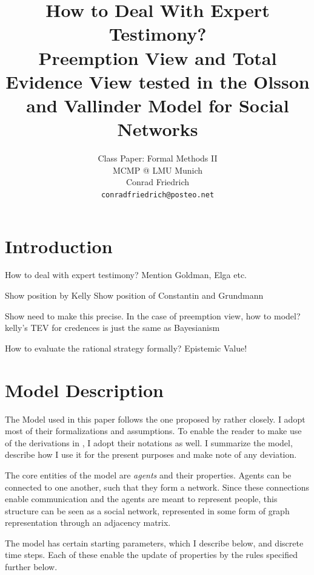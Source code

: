 \documentclass[11pt, a4paper]{article}
\title{\textbf{How to Deal With Expert Testimony?} \\Preemption View and Total Evidence View tested in the Olsson and Vallinder Model for Social Networks }
\author{Class Paper: Formal Methods II \\ MCMP @ LMU Munich \\ Conrad Friedrich \\ \texttt{conradfriedrich@posteo.net}}
\renewcommand{\i}[1]{\emph{#1}}
\begin{document}
\maketitle
{}

\section{Introduction}
How to deal with expert testimony? Mention Goldman, Elga etc.

Show position by Kelly
Show position of Constantin and Grundmann

Show need to make this precise. In the case of preemption view, how to model? 
kelly's TEV for credences is just the same as Bayesianism 

How to evaluate the rational strategy formally?
Epistemic Value!

\section{Model Description}

The Model used in this paper follows the one proposed by \textcite{Olsson2013} rather closely. I adopt most of their formalizations and assumptions. To enable the reader to make use of the derivations in \textcite{Angere2010}, I adopt their notations as well. I summarize the model, describe how I use it for the present purposes and make note of any deviation.

The core entities of the model are \i{agents} and their properties. Agents can be connected to one another, such that they form a network. Since these connections enable communication and the agents are meant to represent people, this structure can be seen as a social network, represented in some form of graph representation through an adjacency matrix.

The model has certain starting parameters, which I describe below, and discrete time steps. Each of these enable the update of properties by the rules specified further below.
\end{document}
